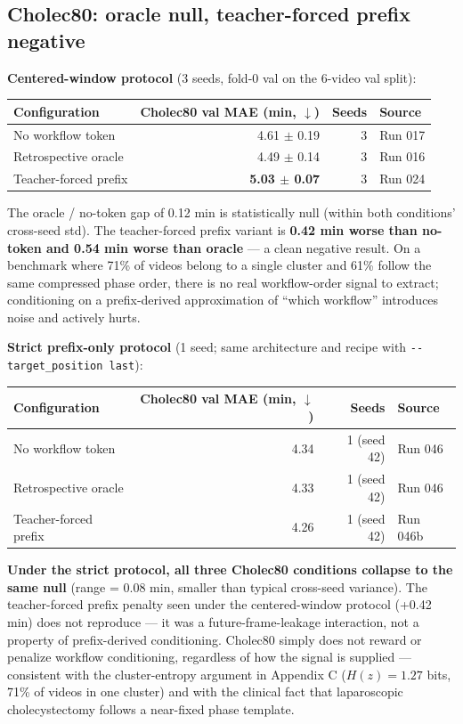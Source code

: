 \subsection{Cholec80: oracle null, teacher-forced prefix
negative}\label{cholec80-oracle-null-teacher-forced-prefix-negative}

\textbf{Centered-window protocol} (3 seeds, fold-0 val on the 6-video
val split):

\begin{longtable}[]{@{}lrrl@{}}
\toprule\noalign{}
Configuration & Cholec80 val MAE (min, $\downarrow$) & Seeds & Source \\
\midrule\noalign{}
\endhead
\bottomrule\noalign{}
\endlastfoot
No workflow token & 4.61 $\pm$ 0.19 & 3 & Run 017 \\
Retrospective oracle & 4.49 $\pm$ 0.14 & 3 & Run 016 \\
Teacher-forced prefix & \textbf{5.03 $\pm$ 0.07} & 3 & Run 024 \\
\end{longtable}

The oracle / no-token gap of 0.12 min is statistically null (within both
conditions' cross-seed std). The teacher-forced prefix variant is
\textbf{0.42 min worse than no-token and 0.54 min worse than oracle} ---
a clean negative result. On a benchmark where 71\% of videos belong to a
single cluster and 61\% follow the same compressed phase order, there is
no real workflow-order signal to extract; conditioning on a
prefix-derived approximation of ``which workflow'' introduces noise and
actively hurts.

\textbf{Strict prefix-only protocol} (1 seed; same architecture and
recipe with \texttt{-\/-target\_position\ last}):

\begin{longtable}[]{@{}lrrl@{}}
\toprule\noalign{}
Configuration & Cholec80 val MAE (min, $\downarrow$) & Seeds & Source \\
\midrule\noalign{}
\endhead
\bottomrule\noalign{}
\endlastfoot
No workflow token & 4.34 & 1 (seed 42) & Run 046 \\
Retrospective oracle & 4.33 & 1 (seed 42) & Run 046 \\
Teacher-forced prefix & 4.26 & 1 (seed 42) & Run 046b \\
\end{longtable}

\textbf{Under the strict protocol, all three Cholec80 conditions
collapse to the same null} (range = 0.08 min, smaller than typical
cross-seed variance). The teacher-forced prefix penalty seen under the
centered-window protocol (+0.42 min) does not reproduce — it was a
future-frame-leakage interaction, not a property of prefix-derived
conditioning. Cholec80 simply does not reward or penalize workflow
conditioning, regardless of how the signal is supplied — consistent
with the cluster-entropy argument in Appendix C ($H(z) = 1.27$ bits,
71\% of videos in one cluster) and with the clinical fact that
laparoscopic cholecystectomy follows a near-fixed phase template.

